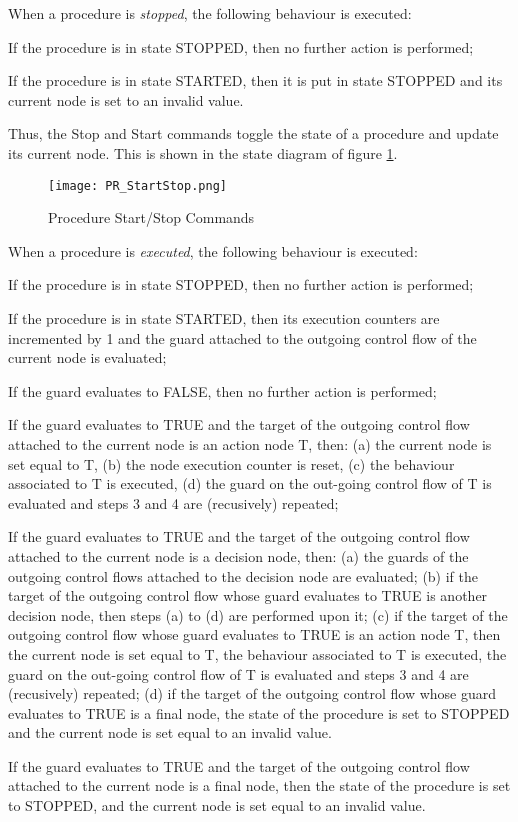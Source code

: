 When a procedure is \emph{stopped}, the following behaviour is executed:

\begin{fw_enumerate}
\item If the procedure is in state STOPPED, then no further action is performed;
\item If the procedure is in state STARTED, then it is put in state STOPPED and its current
node is set to an invalid value.
\end{fw_enumerate}

Thus, the Stop and Start commands toggle the state of a procedure and update its current node.
This is shown in the state diagram of figure \ref{fig:PR_StartStop}.

\begin{figure}[ht]
 \centering
 \texttt{[image: PR\_StartStop.png]}
 \caption{Procedure Start/Stop Commands}
 \label{fig:PR_StartStop}
\end{figure}

When a procedure is \emph{executed}, the following behaviour is executed:
\begin{fw_enumerate}
\item If the procedure is in state STOPPED, then no further action is performed;
\item If the procedure is in state STARTED, then its execution counters are incremented
by 1 and the guard attached to the outgoing control flow of the current node is evaluated;
\item If the guard evaluates to FALSE, then no further action is performed;
\item If the guard evaluates to TRUE and the target of the outgoing control flow attached to
the current node is an action node T, then: (a) the current node is set equal to T, (b) the
node execution counter is reset, (c) the
behaviour associated to T is executed, (d) the guard on the out-going control flow of T is evaluated
and steps 3 and 4 are (recusively) repeated;
\item If the guard evaluates to TRUE and the target of the outgoing control flow attached to
the current node is a decision node, then: (a) the guards of the outgoing control flows
attached to the decision node are evaluated; (b) if the target of the outgoing control
flow whose guard evaluates to TRUE is another decision node, then steps (a) to (d) are
performed upon it; (c) if the target of the outgoing control flow whose guard evaluates
to TRUE is an action node T, then the current node is set equal to T, the behaviour
associated to T is executed, the guard on the out-going control flow of T is evaluated
and steps 3 and 4 are (recusively) repeated; (d) if the target of the
outgoing control flow whose guard evaluates to TRUE is a final node, the state of the
procedure is set to STOPPED and the current node is set equal to an invalid value.
\item If the guard evaluates to TRUE and the target of the outgoing control flow attached to
the current node is a final node, then the state of the procedure is set to STOPPED,
and the current node is set equal to an invalid value.
\end{fw_enumerate}

